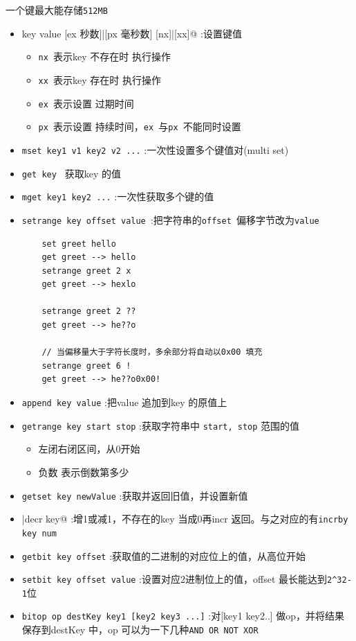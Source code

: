 \documentclass[UTF8,a4paper,12pt]{ctexbook}
\begin{document}
		一个键最大能存储\verb|512MB|
		
		\begin{itemize}[itemindent = 1em] 
			\item \verb@set key value [ex 秒数]|[px 毫秒数]  [nx]|[xx]@	:设置键值
				\begin{itemize}
					\item \verb|nx |表示key 不存在时 执行操作
					\item \verb|xx |表示key 存在时 执行操作
					\item \verb|ex |表示设置 过期时间
					\item \verb|px |表示设置 持续时间，\verb|ex |与\verb|px |不能同时设置
				\end{itemize}
			\item \verb|mset key1 v1 key2 v2 ...| :一次性设置多个键值对(multi set) 			
			\item \verb|get key | 获取key 的值
			\item \verb|mget key1 key2 ...| :一次性获取多个键的值
			\item \verb|setrange key offset value |:把字符串的\verb|offset |偏移字节改为\verb|value|
				\begin{lstlisting}
	set greet hello
	get greet --> hello
	setrange greet 2 x
	get greet --> hexlo
	
	setrange greet 2 ??
	get greet --> he??o
	
	// 当偏移量大于字符长度时，多余部分将自动以0x00 填充
	setrange greet 6 !
	get greet --> he??o0x00!
				\end{lstlisting}
			\item \verb|append key value| :把value 追加到key 的原值上
			\item \verb|getrange key start stop| :获取字符串中 \verb|start, stop| 范围的值
				\begin{itemize}
					\item 左闭右闭区间，从0开始
					\item 负数 表示倒数第多少
				\end{itemize}
			
			\item \verb|getset key newValue| :获取并返回旧值，并设置新值
			\item \verb@incr|decr key@ :增1或减1，不存在的key 当成0再incr 返回。与之对应的有\verb|incrby key num|
			\item \verb|getbit key offset| :获取值的二进制的对应位上的值，从高位开始
			\item \verb|setbit key offset value| :设置对应2进制位上的值，offset 最长能达到\verb|2^32-1|位
			\item \verb|bitop op destKey key1 [key2 key3 ...]| :对[key1 key2..] 做op，并将结果保存到destKey 中，op 可以为一下几种\verb|AND OR NOT XOR|
		\end{itemize}
				
\end{document}
